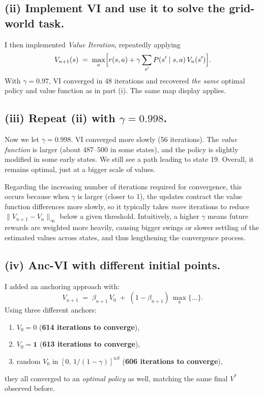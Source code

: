 \subsection*{(ii) Implement VI and use it to solve the grid-world task.}

\noindent
I then implemented \emph{Value Iteration}, repeatedly applying
\[
  V_{n+1}(s) 
   \;=\;\max_{a}\Bigl[r(s,a) + \gamma\sum_{s'}P(s'\mid s,a)\,V_{n}(s')\Bigr].
\]
With \(\gamma=0.97\), VI converged in 48 iterations and recovered \emph{the same} 
optimal policy and value function as in part (i). The same map display applies.

\subsection*{(iii) Repeat (ii) with \(\gamma=0.998\).}

\noindent
Now we let \(\gamma=0.998\).  VI converged more slowly (56 iterations). 
The \emph{value function} is larger (about 487--500 in some states), 
and the policy is slightly modified in some early states.  
We still see a path leading to state 19. 
Overall, it remains optimal, just at a bigger scale of values.

Regarding the increasing number of iterations required for convergence, this occurs because when \(\gamma\) is larger (closer to 1), the updates contract the value function differences more slowly, so it typically takes \emph{more} iterations to reduce \( \|V_{n+1} - V_n\|_{\infty} \) below a given threshold. Intuitively, a higher \(\gamma\) means future rewards are weighted more heavily, causing bigger swings or slower settling of the estimated values across states, and thus lengthening the convergence process.


\subsection*{(iv) Anc-VI with different initial points.}

\noindent
I added an anchoring approach with:
\[
  V_{n+1} 
   \;=\;\beta_{n+1}\,V_0 \;+\;(1-\beta_{n+1})\,\max_{a}\{\dots\}.
\]
Using three different anchors:
\begin{enumerate}[label=(\alph*)]
\item $V_0=0$ \quad(\textbf{614 iterations to converge}),
\item $V_0= \mathbf{1}$ \quad(\textbf{613 iterations to converge}),
\item random $V_0$ in $[0,\,1/(1-\gamma)]^{nS}$ \quad(\textbf{606 iterations to converge}),
\end{enumerate}
they all converged to an \emph{optimal policy} as well, matching the same final $V^*$ observed before.  

